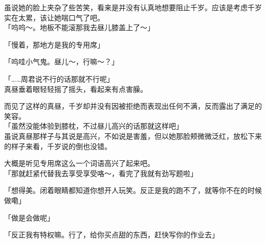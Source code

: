 虽说她的脸上夹杂了些苦笑，看来是并没有认真地想要阻止千岁。应该是考虑千岁实在太累，该让她喘口气了吧。\\

「呜呜～。地板不能滚那我去昼儿膝盖上了～」

「慢着，那地方是我的专用席」

「呜哇小气鬼。昼儿～，行嘛～？」

「……周君说不行的话那就不行呢」\\

真昼垂着眼轻轻摇了摇头，看起来有点害臊。

而见了这样的真昼，千岁却并没有因被拒绝而表现出任何不满，反而露出了满足的笑容。\\

「虽然没能体验到膝枕，不过昼儿高兴的话那就这样吧」\\

虽说真昼那样子与其说是高兴，不如说是害羞，但以她那脸颊微微泛红，放松下来的样子来看，千岁说的倒也没错。

大概是听见专用席这么一个词语高兴了起来吧。\\

「那就赶紧代替我去享受享受咯～，看完了我就有劲写题啦」

「想得美。闭着眼睛都知道你想开人玩笑。反正是我的跑不了，就等你不在的时候做嘞」

「做是会做呢」

「反正我有特权嘛。行了，给你买点甜的东西，赶快写你的作业去」

